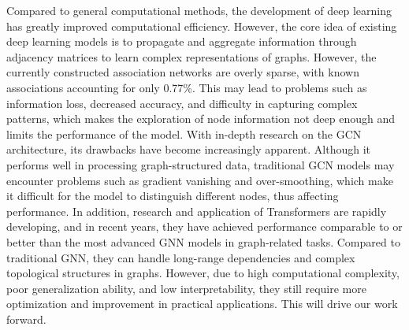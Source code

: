 \documentclass[lettersize,journal]{IEEEtran}
\begin{document}
Compared to general computational methods, the development of deep learning has greatly improved computational efficiency.
However, the core idea of existing deep learning models is to propagate and aggregate information through adjacency matrices to learn complex representations of graphs. However, the currently constructed association networks are overly sparse, with known associations accounting for only 0.77\%. This may lead to problems such as information loss, decreased accuracy, and difficulty in capturing complex patterns, which makes the exploration of node information not deep enough and limits the performance of the model. With in-depth research on the GCN architecture\cite{kipf2017semisupervisedclassificationgraphconvolutional}, its drawbacks have become increasingly apparent. Although it performs well in processing graph-structured data, traditional GCN models may encounter problems such as gradient vanishing and over-smoothing, which make it difficult for the model to distinguish different nodes, thus affecting performance.
In addition, research and application of Transformers\cite{vaswani2023attentionneed} are rapidly developing, and in recent years, they have achieved performance comparable to or better than the most advanced GNN models in graph-related tasks. Compared to traditional GNN, they can handle long-range dependencies and complex topological structures in graphs. However, due to high computational complexity, poor generalization ability, and low interpretability, they still require more optimization and improvement in practical applications. This will drive our work forward.
\end{document}
